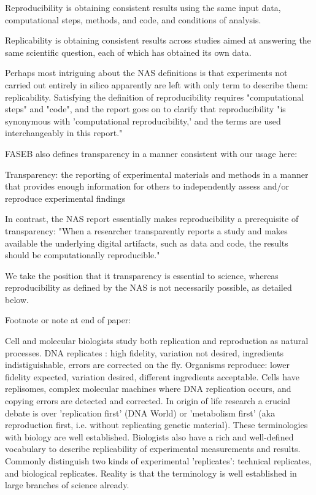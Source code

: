	Reproducibility is obtaining consistent results using the same input data, computational
		steps, methods, and code, and conditions of analysis. 

	Replicability is obtaining consistent results across studies aimed at answering the same
		scientific question, each of which has obtained its own data.


	Perhaps most intriguing about the NAS definitions is that experiments not carried out entirely in silico apparently are left with only term
		to describe them: replicability. Satisfying the definition of reproducibility requires "computational steps" and "code", and  
		the report goes on to clarify that reproducibility "is synonymous with 'computational reproducibility,' and the terms are
		used interchangeably in this report."

	FASEB also defines transparency in a manner consistent with our usage here:

		Transparency:  the reporting of experimental materials and methods in a manner that provides enough information 
		for others to independently assess and/or reproduce experimental findings

	In contrast, the NAS report essentially makes reproducibility a prerequisite of transparency: "When a researcher transparently
		reports a study and makes available the underlying digital artifacts, such as data and code, the results should be 
		computationally reproducible."   

	We take the position that it transparency is essential to science, whereas reproducibility as defined by the NAS is not necessarily possible, as detailed below.

	Footnote or note at end of paper:

			Cell and molecular biologists study both replication and reproduction as natural processes.
			DNA replicates :  high fidelity, variation not desired, ingredients indistiguishable, errors are corrected on the fly.
			Organisms reproduce:  lower fidelity expected, variation desired, different ingredients acceptable.
			Cells have replisomes, complex molecular machines where DNA replication occurs, and copying errors are detected and corrected.
			In origin of life research a crucial debate is over 'replication first' (DNA World) or
 					'metabolism first' (aka reproduction first, i.e. without replicating genetic material).
			These terminologies with biology are well established.
			Biologists also have a rich and well-defined vocabulary to describe replicability of experimental measurements and results.
			Commonly distinguish two kinds of experimental 'replicates':  technical replicates, and biological replicates.
 			Reality is that the terminology is well established in large branches of science already.

